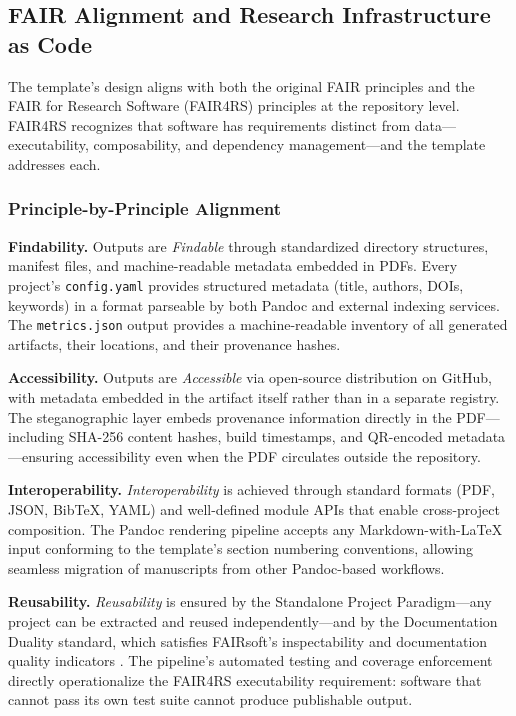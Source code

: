 \documentclass[
  english,
]{article}
\begin{document}
\newpage

\subsection{FAIR Alignment and Research Infrastructure as
Code}\label{fair-alignment-and-research-infrastructure-as-code}

The template's design aligns with both the original FAIR principles
\citep{wilkinson2016fair} and the FAIR for Research Software (FAIR4RS)
principles \citep{barker2022fair4rs} at the repository level. FAIR4RS
recognizes that software has requirements distinct from
data---executability, composability, and dependency management---and the
template addresses each.

\subsubsection{Principle-by-Principle
Alignment}\label{principle-by-principle-alignment}

\textbf{Findability.} Outputs are \emph{Findable} through standardized
directory structures, manifest files, and machine-readable metadata
embedded in PDFs. Every project's \texttt{config.yaml} provides
structured metadata (title, authors, DOIs, keywords) in a format
parseable by both Pandoc and external indexing services. The
\texttt{metrics.json} output provides a machine-readable inventory of
all generated artifacts, their locations, and their provenance hashes.

\textbf{Accessibility.} Outputs are \emph{Accessible} via open-source
distribution on GitHub, with metadata embedded in the artifact itself
rather than in a separate registry. The steganographic layer embeds
provenance information directly in the PDF---including SHA-256 content
hashes, build timestamps, and QR-encoded metadata---ensuring
accessibility even when the PDF circulates outside the repository.

\textbf{Interoperability.} \emph{Interoperability} is achieved through
standard formats (PDF, JSON, BibTeX, YAML) and well-defined module APIs
that enable cross-project composition. The Pandoc rendering pipeline
accepts any Markdown-with-LaTeX input conforming to the template's
section numbering conventions, allowing seamless migration of
manuscripts from other Pandoc-based workflows.

\textbf{Reusability.} \emph{Reusability} is ensured by the Standalone
Project Paradigm---any project can be extracted and reused
independently---and by the Documentation Duality standard, which
satisfies FAIRsoft's inspectability and documentation quality indicators
\citep{garijo2024fairsoft}. The pipeline's automated testing and
coverage enforcement directly operationalize the FAIR4RS executability
requirement: software that cannot pass its own test suite cannot produce
publishable output.
\end{document}

